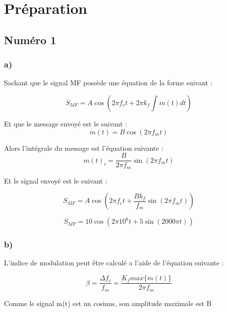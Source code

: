 
\chapter{Préparation}
\section*{Numéro 1}
\subsection*{a)}

Sachant que le signal MF possède une équation de la forme suivant :

\begin{equation}
	S_{MF} = A\cos(2\pi f_c t + 2\pi k_f \int m(t)dt)
\end{equation}

Et que le message envoyé est le suivant :
\begin{equation}
	m(t) = B \cos(2\pi f_m t)
\end{equation}

Alors l'intégrale du message est l'équation suivante :
\begin{equation}
	m(t)_i = \frac{B}{2\pi f_m}\sin(2\pi f_m t)
\end{equation}

Et le signal envoyé est le suivant :

\begin{equation}
	S_{MF} = A\cos(2\pi f_c t + \frac{B k_f}{f_m}\sin(2\pi f_m t))
\end{equation}


\begin{equation}
	S_{MF} = 10 \cos(2\pi 10^6 t + 5\sin(2000\pi  t))
\end{equation}


\subsection*{b)}

L'indice de modulation peut être calculé a l'aide de l'équation suivante :

\begin{equation}
	\beta = \frac{\Delta f_c}{f_m} = \frac{K_f max\{m(t)\}}{2\pi f_m}
\end{equation}

Comme le signal m(t) est un cosinus, son amplitude maximale est B


